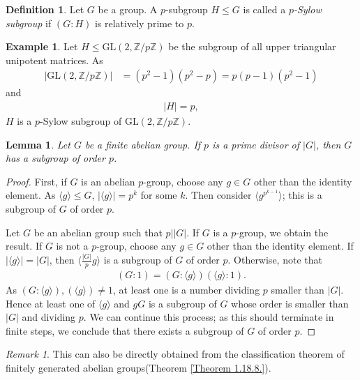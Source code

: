 \documentclass[12pt]{report}
\theoremstyle{plain}
\newtheorem{lemma}[theorem]{Lemma}
\theoremstyle{remark}
\newtheorem*{remark}{Remark}
\theoremstyle{definition}
\newtheorem{definition}[theorem]{Definition}
\newtheorem{example}[theorem]{Example}
\newcommand{\Z}{\mathbb{Z}}
\begin{document}
\begin{definition}
    Let $G$ be a group. A $p$-subgroup $H\le G$ is called a \emph{$p$-Sylow subgroup} if $(G:H)$ is relatively prime to $p$.
\end{definition}

\begin{example}
    Let $H\le \mathrm{GL}(2,\Z/p\Z)$ be the subgroup of all upper triangular unipotent matrices. As
    \begin{align*}
        |\mathrm{GL}(2,\Z/p\Z)| &= (p^2-1)(p^2-p) = p(p-1)(p^2-1)
    \end{align*}
    and
    \begin{align*}
        |H|=p,
    \end{align*}
    $H$ is a $p$-Sylow subgroup of $\mathrm{GL}(2,\Z/p\Z)$.
\end{example}

\begin{lemma}
    Let $G$ be a finite abelian group. If $p$ is a prime divisor of $|G|$, then $G$ has a subgroup of order $p$.
\end{lemma}
\begin{proof}
    First, if $G$ is an abelian $p$-group, choose any $g\in G$ other than the identity element. As $\langle g\rangle\le G$, $|\langle g\rangle|=p^k$ for some $k$. Then consider $\langle g^{p^{k-1}}\rangle$; this is a subgroup of $G$ of order $p$.

    Let $G$ be an abelian group such that $p||G|$. If $G$ is a $p$-group, we obtain the result. If $G$ is not a $p$-group, choose any $g\in G$ other than the identity element. If $|\langle g\rangle| = |G|$, then $\langle \frac{|G|}{p}g\rangle$ is a subgroup of $G$ of order $p$. Otherwise, note that
    \begin{align*}
        (G:1)=(G:\langle g\rangle)(\langle g\rangle : 1).
    \end{align*}
    As $(G:\langle g\rangle),(\langle g\rangle)\neq 1$, at least one is a number dividing $p$ smaller than $|G|$. Hence at least one of $\langle g\rangle$ and $gG$ is a subgroup of $G$ whose order is smaller than $|G|$ and dividing $p$. We can continue this process; as this should terminate in finite steps, we conclude that there exists a subgroup of $G$ of order $p$.
\end{proof}
\begin{remark}
    This can also be directly obtained from the classification theorem of finitely generated abelian groups(Theorem \ref{Theorem 1.18.8.}). 
\end{remark}
\end{document}
